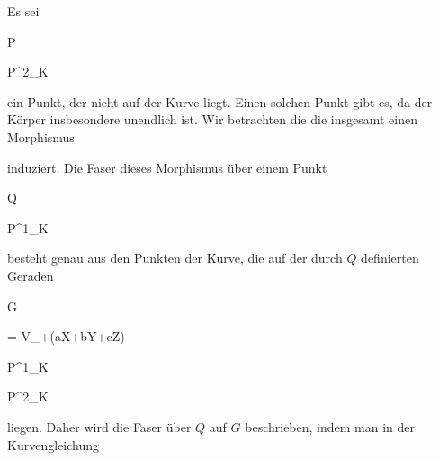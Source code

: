 {


Es sei


\mavergleichskette

{\vergleichskette

{ P
}

{ \in }{ {\mathbb P}^{2}_{K}
}

{  }{
}

{    }{
}

{   }{
}

}
{}{}{}
ein Punkt, der nicht auf der Kurve liegt. Einen solchen Punkt gibt es, da der Körper insbesondere unendlich ist. Wir betrachten die
die insgesamt einen Morphismus


 {  }


induziert. Die Faser dieses Morphismus über einem Punkt


\mavergleichskette

{\vergleichskette

{ Q
}

{ \in }{ {\mathbb P}^{1}_{K}
}

{  }{
}

{    }{
}

{   }{
}

}
{}{}{}
 {} {}
besteht genau aus den Punkten der Kurve, die auf der durch $Q$ definierten Geraden


\mavergleichskettedisp

{\vergleichskette

{ G
}

{ =} { V_+(aX+bY+cZ)
}

{ \cong} { {\mathbb P}^{1}_{K}
}

{ \subset} { {\mathbb P}^{2}_{K}
}

{ } {
}

}
{}{}{}
liegen. Daher wird die Faser über $Q$ auf $G$ beschrieben, indem man in der Kurvengleichung


\mavergleichskette

}
